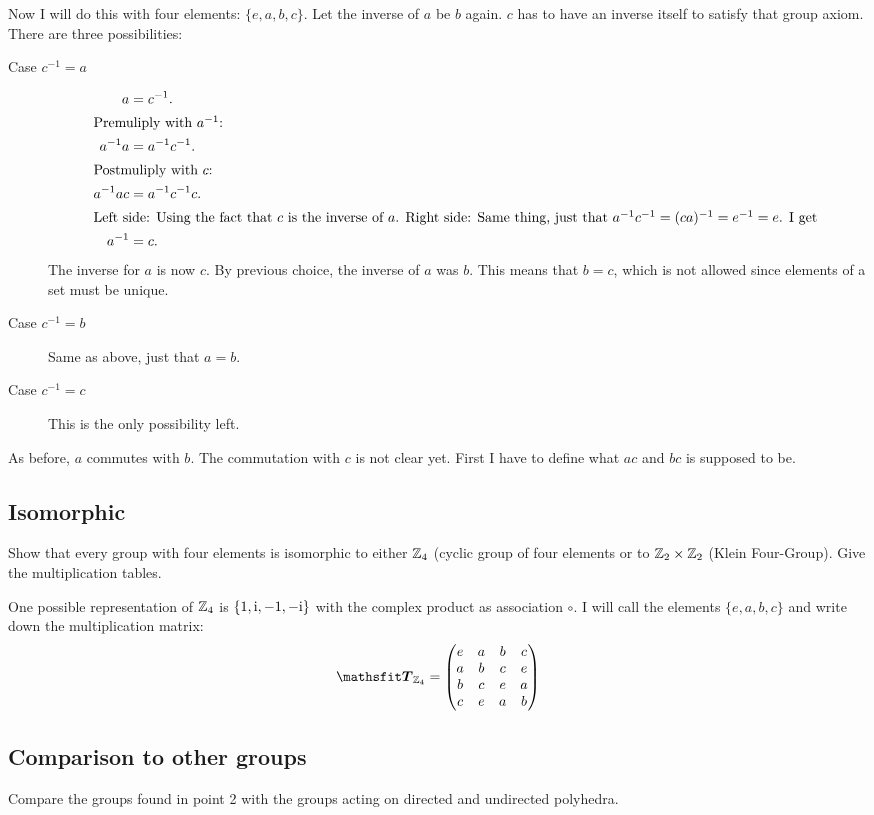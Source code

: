 \documentclass[11pt, ngerman, fleqn, DIV=15, headinclude, BCOR=1cm]{scrartcl}
\newcommand\inv{^{-1}}
\begin{document}
Now I will do this with four elements: $\{e, a, b, c\}$. Let the inverse of $a$
be $b$ again. $c$ has to have an inverse itself to satisfy that group axiom.
There are three possibilities:

\begin{description}
    \item[Case $c\inv = a$]
        \begin{align*}
            a &= c\inv. \\
            \intertext{%
                Premuliply with $a\inv$:
            }
            a\inv a &= a\inv c\inv. \\
            \intertext{%
                Postmuliply with $c$:
            }
            a\inv a c &= a\inv c\inv c. \\
            \intertext{%
                Left side: Using the fact that $c$ is the inverse of $a$. Right
                side: Same thing, just that $a\inv c\inv = (ca)\inv = e\inv =
                e$. I get
            }
            a\inv &= c.
        \end{align*}
        The inverse for $a$ is now $c$. By previous choice, the inverse of $a$
        was $b$. This means that $b = c$, which is not allowed since elements
        of a set must be unique.

    \item[Case $c\inv = b$]
        Same as above, just that $a = b$.

    \item[Case $c\inv = c$]
        This is the only possibility left.
\end{description}

As before, $a$ commutes with $b$. The commutation with $c$ is not clear yet.
First I have to define what $ac$ and $bc$ is supposed to be.

\subsection{Isomorphic}

\begin{problem}
    Show that every group with four elements is isomorphic to either $\mathbb Z_4$
    (cyclic group of four elements or to $\mathbb Z_2 \times \mathbb Z_2$ (Klein Four-Group).
    Give the multiplication tables.
\end{problem}

One possible representation of $\mathbb Z_4$ is $\{1, \mathrm i, -1, -\mathrm i\}$ with the
complex product as association $\circ$. I will call the elements $\{e, a, b,
c\}$ and write down the multiplication matrix:
\[
    \tens T_{\Z_4} =
    \begin{pmatrix}
        e & a & b & c \\
        a & b & c & e \\
        b & c & e & a \\
        c & e & a & b
    \end{pmatrix}
\]

\subsection{Comparison to other groups}

\begin{problem}
    Compare the groups found in point 2 with the groups acting on directed and
    undirected polyhedra.
\end{problem}
\end{document}
